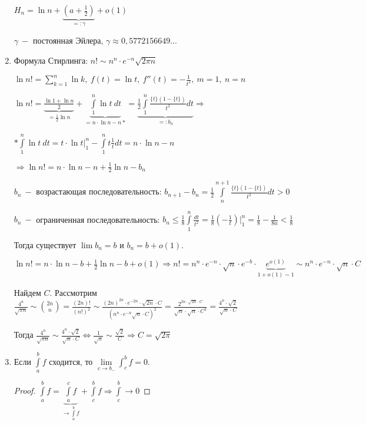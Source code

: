 \begin{example}
\begin{enumerate}
        $H_n=\ln n + \underbrace{(a+\frac{1}{2})}_{=:\gamma}+o(1)$

        $\gamma\ -$ постоянная Эйлера, $\gamma\approx 0,5772156649...$ 

        \item Формула Стирлинга: $n!\sim n^n\cdot e^{-n}\sqrt{2\pi n}$

        $\ln n!=\sum\limits_{k=1}^n\ln k,\ f(t)=\ln t,\ f''(t) =-\frac{1}{t^2},\ m=1,\ n=n$

        $\ln n!=\underbrace{\frac{\ln 1 + \ln n}{2}}_{=\frac{1}{2}\ln n}+\underbrace{\int\limits_1^n\ln t\ dt}_{=n\cdot \ln n - n*}=\underbrace{\frac{1}{2}\int\limits_1^n \frac{\{t\}(1-\{t\})}{t^2}dt}_{=:b_n}\Rightarrow $

        $*\int\limits_1^n\ln t\ dt=t\cdot \ln t\left.\right|_1^n-\int\limits_1^n t\frac{1}{t} dt=n\cdot \ln n-n$

        $\Rightarrow \ln n!=n\cdot \ln n -n+\frac{1}{2}\ln n -b_n$

        $b_n\ -$ возрастающая последовательность: $b_{n+1}-b_n=\frac{1}{2}\int\limits_n^{n+1}\frac{\{t\}(1-\{t\})}{t^2} dt>0$

        $b_n\ -$ ограниченная последовательность: $b_n\leq\frac{1}{8}\int\limits_1^{n}\frac{dt}{t^2}=\frac{1}{8}(-\frac{1}{t})\left.\right|_1^n=\frac{1}{8}-\frac{1}{8n}<\frac{1}{8}$

        Тогда существует $\lim b_n=b$ и $b_n=b+o(1)$.

        $\ln n!=n\cdot \ln n - b + \frac{1}{2}\ln n-b+o(1)\Rightarrow n!=n^n\cdot e^{-n}\cdot\sqrt{n} \cdot e^{-b}\cdot \underbrace{e^{o(1)}}_{1+o(1)\sim 1}\sim n^n\cdot e^{-n}\cdot\sqrt{n} \cdot C$

        Найдем $C$. Рассмотрим $\frac{4^n}{\sqrt{\pi n}}\sim\binom{2n}{n}=\frac{(2n)!}{(n!)^2}\sim\frac{(2n)^{2n}\cdot e^{-2n}\cdot\sqrt{2n}\cdot C}{(n^n\cdot e^{-n}\sqrt{n}\cdot C)^2}=\frac{2^{2n\cdot \sqrt{2n}\cdot C}}{\sqrt{n}\cdot \sqrt{n} \cdot C^2}=\frac{4^n\cdot\sqrt{2}}{\sqrt{n}\cdot C}$

        Тогда $\frac{4^n}{\sqrt{\pi n}}\sim \frac{4^n\cdot \sqrt{2}}{\sqrt{n}\cdot C}\Leftrightarrow \frac{1}{\sqrt{\pi}}\sim \frac{\sqrt{2}}{C}\Rightarrow C=\sqrt{2\pi}$
        \item Если $\int\limits_a^b f$ сходится, то $\lim\limits_{c\rightarrow b_-}\int_c^b f=0$.
        \begin{proof}
            $\int\limits_a^b f=\underbrace{\int\limits_a^c f}_{\rightarrow \int\limits_a^b f} + \int\limits_c^b f\Rightarrow \int\limits_c^b\rightarrow 0$
        \end{proof}
    \end{enumerate}
\end{example}